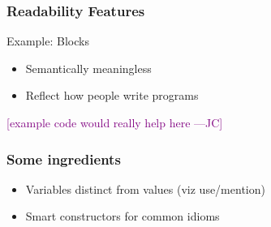 \documentclass{beamer}
\newcommand{\authornote}[3]{\textcolor{#1}{[#3 ---#2]}}
\newcommand{\jc}[1]{\authornote{purple}{JC}{#1}}
\begin{document}

\begin{frame}[fragile]

\frametitle{Readability Features}

Example: Blocks
\begin{itemize}
  \item Semantically meaningless
  \item Reflect how people write programs
\end{itemize}

\jc{example code would really help here}
\end{frame}


\begin{frame}

\frametitle{Some ingredients}

\begin{itemize}
  \item<1-> Variables distinct from values (viz use/mention)
  \item<2-> Smart constructors for common idioms
\end{itemize}

\end{frame}

\end{document}
